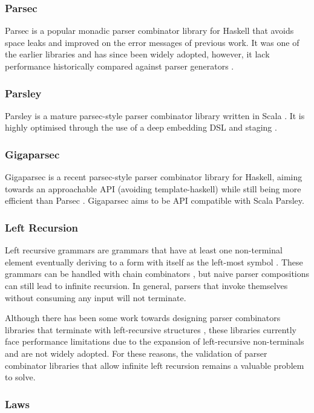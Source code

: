 \documentclass[11pt]{article}
\begin{document}
\subsubsection{Parsec}
Parsec \cite{parsec} is a popular monadic parser combinator library for Haskell that avoids space leaks and improved on the error messages of previous work. It was one of the earlier libraries and has since been widely adopted, however, it lack performance historically compared against parser generators \cite{staged-selective}.
\subsubsection{Parsley}
Parsley is a mature parsec-style parser combinator library written in Scala \cite{parsley}. It is highly optimised through the use of a deep embedding DSL and staging \cite{staged-selective}. 
\subsubsection{Gigaparsec}
Gigaparsec is a recent parsec-style parser combinator library for Haskell, aiming towards an approachable API (avoiding template-haskell) while still being more efficient than Parsec \cite{gigaparsec}. Gigaparsec aims to be API compatible with Scala Parsley.
\subsubsection{Left Recursion}
Left recursive grammars are grammars that have at least one non-terminal element eventually deriving to a form with itself as the left-most symbol \cite{left-recursive}. These grammars can be handled with chain combinators \cite{design-patterns}, but naive parser compositions can still lead to infinite recursion. In general, parsers that invoke themselves without consuming any input will not terminate.

Although there has been some work towards designing parser combinators libraries that terminate with left-recursive structures \cite{left-recursive-detect}, these libraries currently face performance limitations due to the expansion of left-recursive non-terminals and are not widely adopted. For these reasons, the validation of parser combinator libraries that allow infinite left recursion remains a valuable problem to solve.
\subsubsection{Laws}
\end{document}
